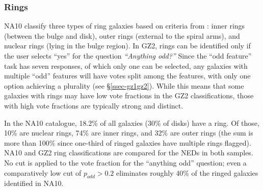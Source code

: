 \documentclass[useAMS,usenatbib]{mn2e}
\providecommand{\DIFaddtex}[1]{{\protect\color{blue}\uwave{#1}}} %
\providecommand{\DIFdeltex}[1]{{\protect\color{red}\sout{#1}}}                      %
\providecommand{\DIFaddbegin}{} %
\providecommand{\DIFaddend}{} %
\providecommand{\DIFdelbegin}{} %
\providecommand{\DIFdelend}{} %
\providecommand{\DIFadd}[1]{\texorpdfstring{\DIFaddtex{#1}}{#1}} %
\providecommand{\DIFdel}[1]{\texorpdfstring{\DIFdeltex{#1}}{}} %
\begin{document}

\subsubsection{Rings}

NA10 classify three types of ring galaxies based on criteria from \citet{but96}: inner rings (between the bulge and disk), outer rings (external to the spiral arms), and nuclear rings (lying in the bulge region). In GZ2, rings can be identified only if the user selects ``yes'' for the question {\it ``Anything odd?''} Since the ``odd feature'' task has seven responses, of which only one can be selected, any galaxies with multiple ``odd'' features will have votes split among the features, with only one option achieving a plurality (see \S\ref{ssec-gz1gz2}). While this means that some galaxies with rings may have low vote fractions in the GZ2 classifications, those with high vote fractions are typically strong and distinct.

In the NA10 catalogue, 18.2\% of all galaxies (30\% of disks) have a ring. Of those, 10\% are nuclear rings, 74\% are inner rings, and 32\% are outer rings (the sum is more than 100\% since one-third of ringed galaxies have multiple rings flagged). NA10 and GZ2 ring classifications are compared for the NEDs in both samples. No cut is applied to the vote fraction for the ``anything odd'' question; even a comparatively low cut of \DIFdelbegin \DIFdel{$p_{odd}>0.2$ }\DIFdelend \DIFaddbegin \DIFadd{$p_\mathrm{odd}>0.2$ }\DIFaddend eliminates roughly 40\% of the ringed galaxies identified in NA10. %
\end{document}
